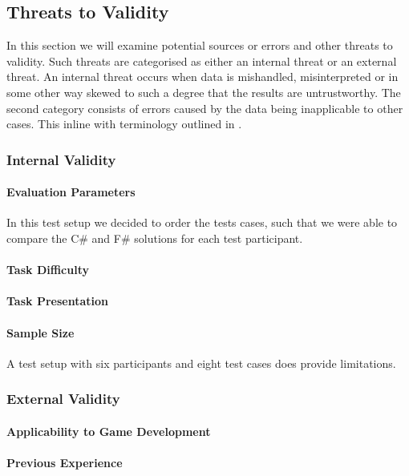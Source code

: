 \subsection{Threats to Validity} \label{sec:validity}
In this section we will examine potential sources or errors and other threats to validity. Such threats are categorised as either an internal threat or an external threat. An internal threat occurs when data is mishandled, misinterpreted or in some other way skewed to such a degree that the results are untrustworthy. The second category consists of errors caused by the data being inapplicable to other cases. This inline with terminology outlined in \cite{mcleod:validity}.


\subsubsection{Internal Validity}
\metasheep

\paragraph{Evaluation Parameters}
In this test setup we decided to order the tests cases, such that we were able to compare the C\# and F\# solutions for each test participant.  

\paragraph{Task Difficulty}

\paragraph{Task Presentation}

\paragraph{Sample Size}
A test setup with six participants and eight test cases does provide limitations.

\subsubsection{External Validity}
\metasheep

\paragraph{Applicability to Game Development}

\paragraph{Previous Experience}

